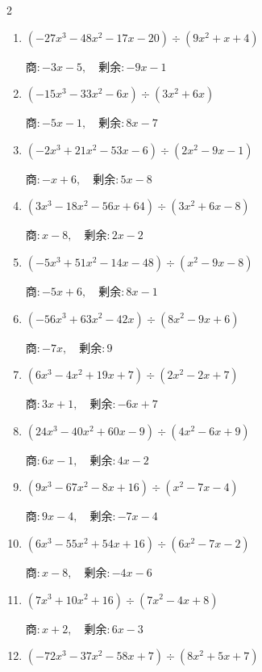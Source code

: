 \begin{multicols}{2}
\begin{enumerate}
  \item $(-27x^{3}-48x^{2}-17x-20) \div (9x^{2}+x+4)$

        $商 : -3x-5, \quad 剰余 : -9x-1$

  \item $(-15x^{3}-33x^{2}-6x) \div (3x^{2}+6x)$

        $商 : -5x-1, \quad 剰余 : 8x-7$

  \item $(-2x^{3}+21x^{2}-53x-6) \div (2x^{2}-9x-1)$

        $商 : -x+6, \quad 剰余 : 5x-8$

  \item $(3x^{3}-18x^{2}-56x+64) \div (3x^{2}+6x-8)$

        $商 : x-8, \quad 剰余 : 2x-2$

\columnbreak %

  \item $(-5x^{3}+51x^{2}-14x-48) \div (x^{2}-9x-8)$

        $商 : -5x+6, \quad 剰余 : 8x-1$

  \item $(-56x^{3}+63x^{2}-42x) \div (8x^{2}-9x+6)$

        $商 : -7x, \quad 剰余 : 9$

  \item $(6x^{3}-4x^{2}+19x+7) \div (2x^{2}-2x+7)$

        $商 : 3x+1, \quad 剰余 : -6x+7$

  \item $(24x^{3}-40x^{2}+60x-9) \div (4x^{2}-6x+9)$

        $商 : 6x-1, \quad 剰余 : 4x-2$

  \item $(9x^{3}-67x^{2}-8x+16) \div (x^{2}-7x-4)$

        $商 : 9x-4, \quad 剰余 : -7x-4$

\columnbreak %

\resetques

  \item $(6x^{3}-55x^{2}+54x+16) \div (6x^{2}-7x-2)$

        $商 : x-8, \quad 剰余 : -4x-6$

  \item $(7x^{3}+10x^{2}+16) \div (7x^{2}-4x+8)$

        $商 : x+2, \quad 剰余 : 6x-3$

  \item $(-72x^{3}-37x^{2}-58x+7) \div (8x^{2}+5x+7)$


\end{enumerate}
\end{multicols}
